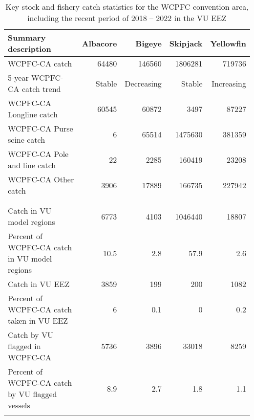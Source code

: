 \begin{longtable}{lrrrr}
\caption{Key stock and fishery catch statistics for the WCPFC convention area, including the recent period of 2018 -- 2022 in the VU EEZ} \\ 
  \hline
Summary description & Albacore & Bigeye & Skipjack & Yellowfin \\ 
  \hline
WCPFC-CA catch & 64480 & 146560 & 1806281 & 719736 \\ 
  5-year WCPFC-CA catch trend & Stable & Decreasing & Stable & Increasing \\ 
  WCPFC-CA Longline catch & 60545 & 60872 & 3497 & 87227 \\ 
  WCPFC-CA Purse seine catch & 6 & 65514 & 1475630 & 381359 \\ 
  WCPFC-CA Pole and line catch & 22 & 2285 & 160419 & 23208 \\ 
  WCPFC-CA Other catch & 3906 & 17889 & 166735 & 227942 \\ 
   &  &  &  &  \\ 
   \hline
 &  &  &  &  \\ 
  Catch in VU model regions & 6773 & 4103 & 1046440 & 18807 \\ 
  Percent of WCPFC-CA catch in VU model regions & 10.5 & 2.8 & 57.9 & 2.6 \\ 
  Catch in VU EEZ & 3859 & 199 & 200 & 1082 \\ 
  Percent of WCPFC-CA catch taken in VU EEZ & 6 & 0.1 & 0 & 0.2 \\ 
  Catch by VU flagged in WCPFC-CA & 5736 & 3896 & 33018 & 8259 \\ 
  Percent of WCPFC-CA catch by VU flagged vessels & 8.9 & 2.7 & 1.8 & 1.1 \\ 
  \hline
\label{cat_sum_tab}
\end{longtable}
